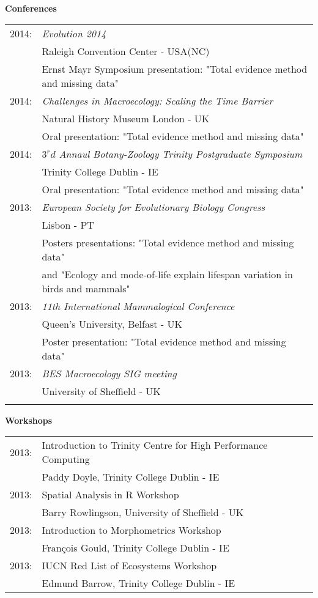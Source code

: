 \documentclass[10pt,a4paper]{article}
\begin{document}
{\raggedright\textbf{Conferences}\\[1.5ex]
\begin{tabular}{ll}
2014: & \textit{Evolution 2014}\\
& Raleigh Convention Center - USA(NC)\\
& Ernst Mayr Symposium presentation: "Total evidence method and missing data" \\
2014: & \textit{Challenges in Macroecology: Scaling the Time Barrier}\\
& Natural History Museum London - UK\\
& Oral presentation: "Total evidence method and missing data" \\
2014: & \textit{$3^rd$ Annaul Botany-Zoology Trinity Postgraduate Symposium}\\
& Trinity College Dublin - IE\\
& Oral presentation: "Total evidence method and missing data" \\
2013: & \textit{European Society for Evolutionary Biology Congress}\\
& Lisbon - PT\\
& Posters presentations: "Total evidence method and missing data" \\
& and "Ecology and mode-of-life explain lifespan variation in birds and mammals"\\
2013: & \textit{11th International Mammalogical Conference} \\
& Queen’s University, Belfast - UK \\
& Poster presentation: "Total evidence method and missing data" \\
2013: & \textit{BES Macroecology SIG meeting} \\
& University of Sheffield - UK\\
& \\
\end{tabular}
\bigskip

\raggedright\textbf{Workshops}\\[1.5ex]
\begin{tabular}{ll}
2013: & Introduction to Trinity Centre for High Performance Computing\\
& Paddy Doyle, Trinity College Dublin - IE\\
2013: & Spatial Analysis in R Workshop\\
& Barry Rowlingson, University of Sheffield - UK\\
2013: & Introduction to Morphometrics Workshop\\
& Fran\c{c}ois Gould, Trinity College Dublin - IE\\
2013: & IUCN Red List of Ecosystems Workshop\\
& Edmund Barrow, Trinity College Dublin - IE\\


\end{tabular}}
\end{document}
